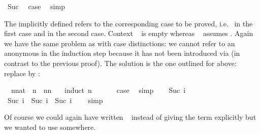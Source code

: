\begin{isabellebody}
\ Suc\ \isamarkupfalse%
\ {\isacharquery}case\ \isamarkupfalse%
\ simp\isanewline
{}\isamarkupfalse%
%
\endisatagproof
{\isafoldproof}%
%
\isadelimproof
%
\endisadelimproof
%
\begin{isamarkuptext}%
\noindent The implicitly defined  refers to the
corresponding case to be proved, i.e.\  in the first case and
 in the second case. Context ~ is
empty whereas ~ assumes . Again we
have the same problem as with case distinctions: we cannot refer to an anonymous 
in the induction step because it has not been introduced via 
(in contrast to the previous proof). The solution is the one outlined for
 above: replace  by :%
\end{isamarkuptext}%
\isamarkuptrue%
\isamarkupfalse%
\ \ n{\isacharcolon}{\isacharcolon}nat\ \ {\isachardoublequoteopen}n\ {\isacharless}\ n{\isacharasterisk}n\ {\isacharplus}\ {}{\isachardoublequoteclose}\isanewline
%
\isadelimproof
%
\endisadelimproof
%
\isatagproof
{}\isamarkupfalse%
\ {\isacharparenleft}induct\ n{\isacharparenright}\isanewline
\ \ \isamarkupfalse%
\ {}\ \isamarkupfalse%
\ {\isacharquery}case\ \isamarkupfalse%
\ simp\isanewline
{}\isamarkupfalse%
\isanewline
\ \ \isamarkupfalse%
\ {\isacharparenleft}Suc\ i{\isacharparenright}\ \isamarkupfalse%
\ {\isachardoublequoteopen}Suc\ i\ {\isacharless}\ Suc\ i\ {\isacharasterisk}\ Suc\ i\ {\isacharplus}\ {}{\isachardoublequoteclose}\ \isamarkupfalse%
\ simp\isanewline
{}\isamarkupfalse%
%
\endisatagproof
{\isafoldproof}%
%
\isadelimproof
%
\endisadelimproof
%
\begin{isamarkuptext}%
\noindent Of course we could again have written
~ instead of giving the term explicitly
but we wanted to use  somewhere.%
\end{isamarkuptext}%
\isamarkuptrue%
%
\isamarkuptrue%
%
\begin{isamarkuptext}%

\end{isamarkuptext}
\end{isabellebody}
